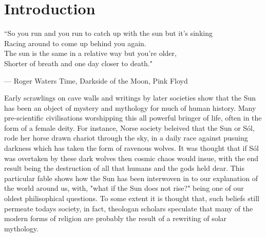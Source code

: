 

\section{Introduction}

\epigraphfontsize{\small\itshape}
\epigraph{``So you run and you run to catch up with the sun but it's sinking \\
Racing around to come up behind you again. \\
The sun is the same in a relative way but you're older, \\
Shorter of breath and one day closer to death."}{--- \textup{Roger Waters} Time, Darkside of the Moon, Pink Floyd}


Early scrawlings on cave walls and writings by later societies show that the Sun has been an object of mystery and mythology for much of human history. Many pre-scientific civilisations worshipping this all powerful bringer of life, often in the form of a female deity. For instance, Norse society beleived that the Sun or Sól, rode her horse drawn chariot through the sky, in a daily race against pusuing darkness which has taken the form of ravenous wolves. It was thought that if Sól was overtaken by these dark wolves then cosmic chaos would insue, with the end result being the destruction of all that humans and the gods held dear. This particular fable shows how the Sun has been interwoven in to our explanation of the world around us, with, "what if the Sun does not rise?" being one of our oldest philisophical questions. To some extent it is thought that, such beliefs still permeate todays society, in fact, theologan scholars speculate that many of the modern forms of religion are probably the result of a rewriting of solar mythology.  


